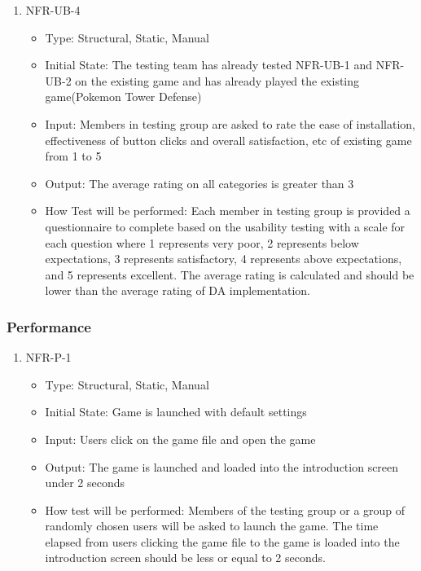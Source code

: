 \documentclass[12,english]{article}
\begin{document}
\begin{enumerate}
    \item NFR-UB-4
    \begin{itemize}
        \item Type: Structural, Static, Manual
        \item Initial State: The testing team has already tested NFR-UB-1 and NFR-UB-2 on the existing game and has already played the existing game(Pokemon Tower Defense)
        \item Input: Members in testing group are asked to rate the ease of installation, effectiveness of button clicks and overall satisfaction, etc of existing game from 1 to 5
        \item Output: The average rating on all categories is greater than 3
        \item How Test will be performed: Each member in testing group is provided a questionnaire to complete based on the usability testing with a scale for each question where 1 represents very poor, 2 represents below expectations, 3 represents satisfactory, 4 represents above expectations, and 5 represents excellent. The average rating is calculated and should be lower than the average rating of DA implementation.
    \end{itemize}
\end{enumerate}


\subsubsection{Performance}

\begin{enumerate}
    \item NFR-P-1
    \begin{itemize}
        \item Type: Structural, Static, Manual
        \item Initial State: Game is launched with default settings
        \item Input: Users click on the game file and open the game
        \item Output: The game is launched and loaded into the introduction screen under 2 seconds
        \item How test will be performed: Members of the testing group or a group of randomly chosen users will be asked to launch the game. The time elapsed from users clicking the game file to the game is loaded into the introduction screen should be less or equal to 2 seconds.
    \end{itemize}
\end{enumerate}
\end{document}
